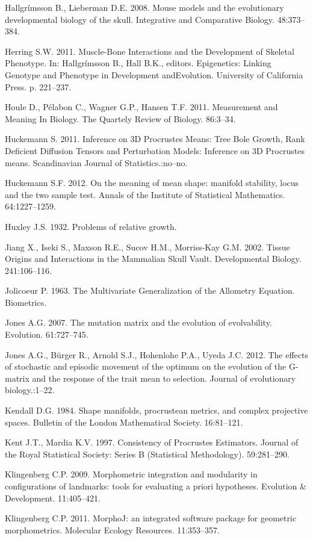 \documentclass[12pt,]{article}
\begin{document}
Hallgrímsson B., Lieberman D.E. 2008. Mouse models and the evolutionary
developmental biology of the skull. Integrative and Comparative Biology.
48:373--384.

Herring S.W. 2011. Muscle-Bone Interactions and the Development of
Skeletal Phenotype. In: Hallgrímsson B., Hall B.K., editors.
Epigenetics: Linking Genotype and Phenotype in Development andEvolution.
University of California Press. p. 221--237.

Houle D., Pélabon C., Wagner G.P., Hansen T.F. 2011. Measurement and
Meaning In Biology. The Quartely Review of Biology. 86:3--34.

Huckemann S. 2011. Inference on 3D Procrustes Means: Tree Bole Growth,
Rank Deficient Diffusion Tensors and Perturbation Models: Inference on
3D Procrustes means. Scandinavian Journal of Statistics.:no--no.

Huckemann S.F. 2012. On the meaning of mean shape: manifold stability,
locus and the two sample test. Annals of the Institute of Statistical
Mathematics. 64:1227--1259.

Huxley J.S. 1932. Problems of relative growth.

Jiang X., Iseki S., Maxson R.E., Sucov H.M., Morriss-Kay G.M. 2002.
Tissue Origins and Interactions in the Mammalian Skull Vault.
Developmental Biology. 241:106--116.

Jolicoeur P. 1963. The Multivariate Generalization of the Allometry
Equation. Biometrics.

Jones A.G. 2007. The mutation matrix and the evolution of evolvability.
Evolution. 61:727--745.

Jones A.G., Bürger R., Arnold S.J., Hohenlohe P.A., Uyeda J.C. 2012. The
effects of stochastic and episodic movement of the optimum on the
evolution of the G-matrix and the response of the trait mean to
selection. Journal of evolutionary biology.:1--22.

Kendall D.G. 1984. Shape manifolds, procrustean metrics, and complex
projective spaces. Bulletin of the London Mathematical Society.
16:81--121.

Kent J.T., Mardia K.V. 1997. Consistency of Procrustes Estimators.
Journal of the Royal Statistical Society: Series B (Statistical
Methodology). 59:281--290.

Klingenberg C.P. 2009. Morphometric integration and modularity in
configurations of landmarks: tools for evaluating a priori hypotheses.
Evolution \& Development. 11:405--421.

Klingenberg C.P. 2011. MorphoJ: an integrated software package for
geometric morphometrics. Molecular Ecology Resources. 11:353--357.
\end{document}
